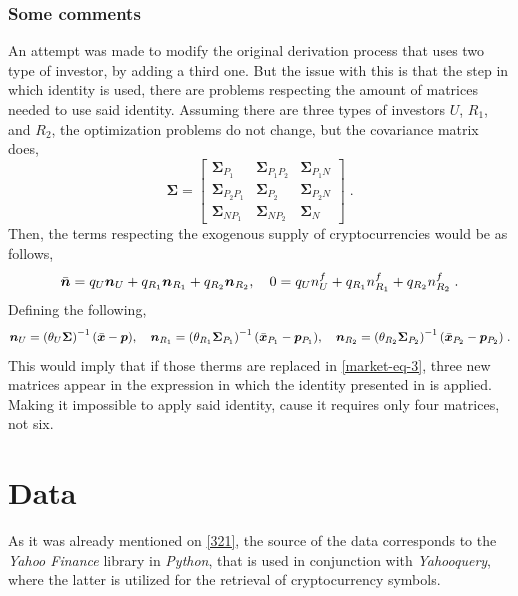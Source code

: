 \subsubsection{Some comments}
An attempt was made to modify the original derivation process that uses two type of investor, by adding a third one. But the issue with this is that the step in which \parencite{Soderstrom2002} identity is used, there are problems respecting the amount of matrices needed to use said identity. Assuming there are three types of investors $U$, $R_1$, and $R_2$, the optimization problems do not change, but the covariance matrix does,
\begin{equation*}
	\bm{\Sigma} = \begin{bmatrix}
		\bm{\Sigma}_{P_1} & \bm{\Sigma}_{P_1 P_2} & \bm{\Sigma}_{P_1 N}\\
		\bm{\Sigma}_{P_2 P_1} & \bm{\Sigma}_{P_2} & \bm{\Sigma}_{P_2 N}\\
		\bm{\Sigma}_{N P_1} & \bm{\Sigma}_{N P_2} & \bm{\Sigma}_{N}
	\end{bmatrix}\;.
\end{equation*}
Then, the terms respecting the exogenous supply of cryptocurrencies would be as follows,
\begin{equation}
	\Bar{\bm{n}} = q_{U}\bm{n}_{U} + q_{R_1}\bm{n}_{R_1}+ q_{R_2}\bm{n}_{R_2},\quad 0 = q_{U}n^{f}_{U} + q_{R_1}n^{f}_{R_1} + q_{R_2}n^{f}_{R_2}\;\label{market-eq-3}.
\end{equation} 
Defining the following,
\begin{equation*}
	\bm{n}_{U} = \left(\theta_{U}\bm{\Sigma}\right)^{-1}(\Bar{\bm{x}} - \bm{p}),\quad \bm{n}_{R_1} = \left(\theta_{R_1}\bm{\Sigma}_{P_1}\right)^{-1}(\Bar{\bm{x}}_{P_1} - \bm{p}_{P_1}),\quad \bm{n}_{R_2} = \left(\theta_{R_2}\bm{\Sigma}_{P_2}\right)^{-1}(\Bar{\bm{x}}_{P_2} - \bm{p}_{P_2})\;. 
\end{equation*}
This would imply that if those therms are replaced in \eqref{market-eq-3}, three new matrices appear in the expression in which the identity presented in \parencite{Soderstrom2002} is applied. Making it impossible to apply said identity, cause it requires only four matrices, not six.

\section{Data}
As it was already mentioned on \ref{321}, the source of the data corresponds to the \textit{Yahoo Finance} library in \textit{Python}, that is used in conjunction with \textit{Yahooquery}, where the latter is utilized for the retrieval of cryptocurrency symbols. 

